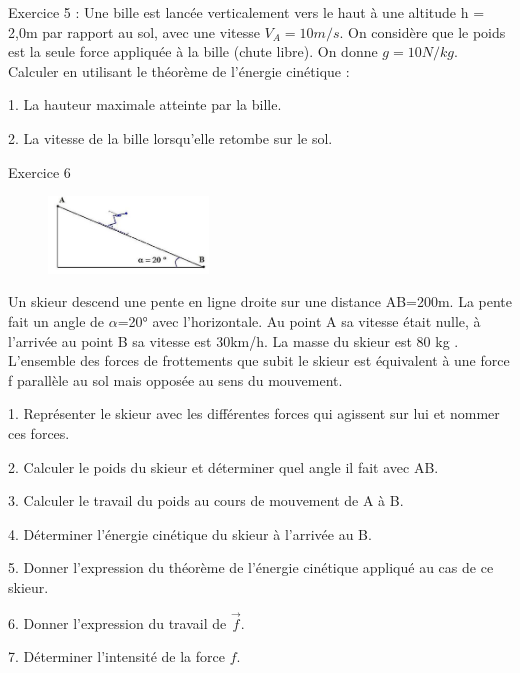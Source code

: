 \documentclass[12pt, french]{article}
\begin{document}
\begin{Box2}{Exercice 5 : }
Une bille est lancée verticalement vers le haut à une altitude
h = 2,0m par rapport au sol, avec une vitesse $V_A= 10 m/s$.
On considère que le poids est la seule force appliquée à la
bille (chute libre).
On donne $g = 10 N/kg$.
Calculer en utilisant le théorème de l’énergie cinétique :

   1. La hauteur maximale atteinte par la bille.

   2. La vitesse de la bille lorsqu’elle retombe sur le sol.
\end{Box2}

\begin{Box2}{Exercice 6}
\begin{figure}
  \begin{center}
    \includegraphics[width=0.38\textwidth]{./img/img02.png}
  \end{center}
\end{figure}
Un skieur descend une pente en ligne droite sur une distance AB=200m. La pente
fait un angle de $\alpha$=20° avec l’horizontale.
Au point A sa vitesse était nulle, à l’arrivée au point B sa vitesse est 30km/h. La
masse du skieur est 80 kg .
L’ensemble des forces de
frottements que subit le skieur est
équivalent à une force f parallèle
au sol mais opposée au sens du
mouvement.

   1. Représenter le skieur avec les différentes forces qui agissent sur lui et nommer ces forces.

   2. Calculer le poids du skieur et déterminer quel angle il fait avec AB.

   3. Calculer le travail du poids au cours de mouvement de A à B.

   4. Déterminer l’énergie cinétique du skieur à l’arrivée au B.

   5. Donner l’expression du théorème de l’énergie cinétique appliqué au cas de ce
skieur.


   6. Donner l’expression du travail de $\vec{f}$.

   7. Déterminer l’intensité de la force $f$.
\end{Box2}
\end{document}
